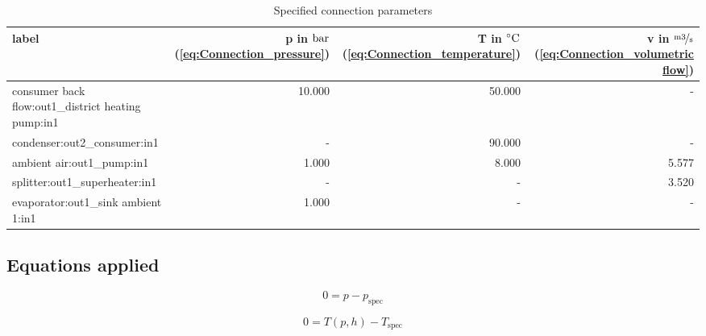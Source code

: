\begin{table}[H]\begin{center}
\begin{tabular}{lrrr}
\toprule
                                              label &  p in $\unit[]{bar}$ (\ref{eq:Connection_pressure}) &  T in $\unit[]{^\circ C}$ (\ref{eq:Connection_temperature}) &  v in $\unitfrac[]{m3}{s}$ (\ref{eq:Connection_volumetric flow}) \\
\midrule
 consumer back flow:out1\_district heating pump:in1 &                                              10.000 &                                                      50.000 &                                                                - \\
                       condenser:out2\_consumer:in1 &                                                   - &                                                      90.000 &                                                                - \\
                         ambient air:out1\_pump:in1 &                                               1.000 &                                                       8.000 &                                                            5.577 \\
                     splitter:out1\_superheater:in1 &                                                   - &                                                           - &                                                            3.520 \\
                evaporator:out1\_sink ambient 1:in1 &                                               1.000 &                                                           - &                                                                - \\
\bottomrule
\end{tabular}
\caption{Specified connection parameters}
\end{center}\end{table}

\subsection{Equations applied}

\begin{equation}
\label{eq:Connection_pressure}
0 = p - p_\mathrm{spec}
\end{equation}

\begin{equation}
\label{eq:Connection_temperature}
0 = T \left(p, h \right) - T_\mathrm{spec}
\end{equation}

